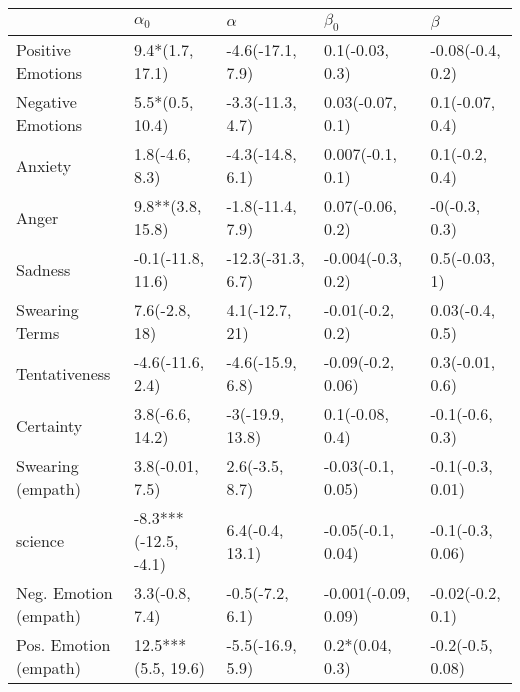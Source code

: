 \begin{tabular}{lllll}
\toprule
{} &            $\alpha_0$ &           $\alpha$ &            $\beta_0$ &           $\beta$ \\
\midrule
Positive Emotions     &       9.4*(1.7, 17.1) &   -4.6(-17.1, 7.9) &      0.1(-0.03, 0.3) &  -0.08(-0.4, 0.2) \\
Negative Emotions     &       5.5*(0.5, 10.4) &   -3.3(-11.3, 4.7) &     0.03(-0.07, 0.1) &   0.1(-0.07, 0.4) \\
Anxiety               &        1.8(-4.6, 8.3) &   -4.3(-14.8, 6.1) &     0.007(-0.1, 0.1) &    0.1(-0.2, 0.4) \\
Anger                 &      9.8**(3.8, 15.8) &   -1.8(-11.4, 7.9) &     0.07(-0.06, 0.2) &     -0(-0.3, 0.3) \\
Sadness               &     -0.1(-11.8, 11.6) &  -12.3(-31.3, 6.7) &    -0.004(-0.3, 0.2) &     0.5(-0.03, 1) \\
Swearing Terms        &         7.6(-2.8, 18) &     4.1(-12.7, 21) &     -0.01(-0.2, 0.2) &   0.03(-0.4, 0.5) \\
Tentativeness         &      -4.6(-11.6, 2.4) &   -4.6(-15.9, 6.8) &    -0.09(-0.2, 0.06) &   0.3(-0.01, 0.6) \\
Certainty             &       3.8(-6.6, 14.2) &    -3(-19.9, 13.8) &      0.1(-0.08, 0.4) &   -0.1(-0.6, 0.3) \\
Swearing (empath)     &       3.8(-0.01, 7.5) &     2.6(-3.5, 8.7) &    -0.03(-0.1, 0.05) &  -0.1(-0.3, 0.01) \\
science               &  -8.3***(-12.5, -4.1) &    6.4(-0.4, 13.1) &    -0.05(-0.1, 0.04) &  -0.1(-0.3, 0.06) \\
Neg. Emotion (empath) &        3.3(-0.8, 7.4) &    -0.5(-7.2, 6.1) &  -0.001(-0.09, 0.09) &  -0.02(-0.2, 0.1) \\
Pos. Emotion (empath) &    12.5***(5.5, 19.6) &   -5.5(-16.9, 5.9) &      0.2*(0.04, 0.3) &  -0.2(-0.5, 0.08) \\
\bottomrule
\end{tabular}
